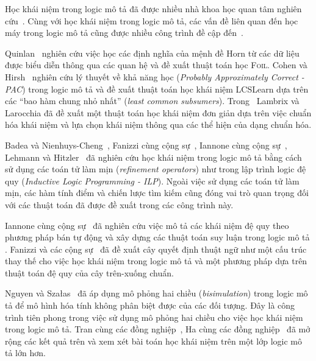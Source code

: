 Học khái niệm trong logic mô tả đã được nhiều nhà khoa học quan tâm nghiên cứu~\cite{Quinlan1990,Cohen1994,Lambrix1998,Badea2000,Iannone2007,Fanizzi2004,Fanizzi2008,Lehmann2007,Fanizzi2010,Lehmann2010,Nguyen2013,Tran2012,Ha2012}. Cùng với học khái niệm trong logic mô tả, các vấn đề liên quan đến học máy trong logic mô tả cũng được nhiều công trình đề cập đến~\cite{Alvarez2000,Kietz2003,Revoredo2010,Konstantopoulos2010,Distel2011}.

Quinlan~\cite{Quinlan1990} nghiên cứu việc học các định nghĩa của mệnh đề Horn từ các dữ liệu được biểu diễn thông qua các quan hệ và đề xuất thuật toán học \textsc{Foil}.
Cohen và Hirsh~\cite{Cohen1994} nghiên cứu lý thuyết về khả năng học ({\em Probably Approximately Correct - PAC}) trong logic mô tả và đề xuất thuật toán học khái niệm LCSLearn dựa trên các ``bao hàm chung nhỏ nhất'' ({\em least common subsumers}).
Trong~\cite{Lambrix1998} Lambrix và Larocchia đã đề xuất một thuật toán học khái niệm đơn giản dựa trên việc chuẩn hóa khái niệm và lựa chọn khái niệm thông qua các thể hiện của dạng chuẩn hóa. 

Badea và Nienhuys-Cheng~\cite{Badea2000}, Fanizzi cùng cộng sự~\cite{Fanizzi2004,Fanizzi2008}, Iannone cùng cộng sự~\cite{Iannone2007}, Lehmann và Hitzler~\cite{Lehmann2007,Lehmann2010} đã nghiên cứu học khái niệm trong logic mô tả bằng cách sử dụng các toán tử làm mịn ({\em refinement operators}) như trong lập trình logic đệ quy ({\em Inductive Logic Programming - ILP}).
Ngoài việc sử dụng các toán tử làm mịn, các hàm tính điểm và chiến lược tìm kiếm cũng đóng vai trò quan trọng đối với các thuật toán đã được đề xuất trong các công trình này. 

Iannone cùng cộng sự~\cite{Iannone2007} đã nghiên cứu việc mô tả các khái niệm đệ quy theo phương pháp bán tự động và xây dựng các thuật toán suy luận trong logic mô tả \ALC.
%
Fanizzi và các cộng sự~\cite{Fanizzi2010} đã đề xuất cây quyết định thuật ngữ như một cấu trúc thay thế cho việc học khái niệm trong logic mô tả và một phương pháp dựa trên thuật toán đệ quy của cây trên-xuống chuẩn.

Nguyen và Sza{\l}as~\cite{Nguyen2013} đã áp dụng mô phỏng hai chiều ({\em bisimulation}) trong logic mô tả để mô hình hóa tính không phân biệt được của các đối tượng. Đây là công trình tiên phong trong việc sử dụng mô phỏng hai chiều cho việc học khái niệm trong logic mô tả. Tran cùng các đồng nghiệp~\cite{Tran2012}, Ha cùng các đồng nghiệp~\cite{Ha2012} đã mở rộng các kết quả trên và xem xét bài toán học khái niệm trên một lớp logic mô tả lớn hơn.

